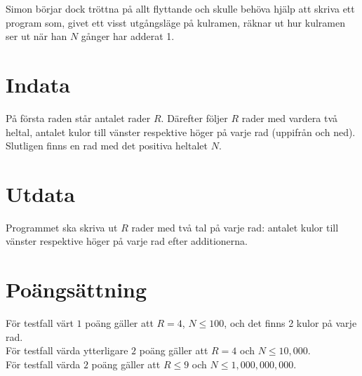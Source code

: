 Simon börjar dock tröttna på allt flyttande och skulle behöva hjälp
att skriva ett program som, givet ett visst utgångsläge på kulramen,
räknar ut hur kulramen ser ut när han $N$ gånger har adderat
1.

\section*{Indata}
På första raden står antalet rader $R$. Därefter följer $R$ rader med vardera två heltal, antalet kulor
till vänster respektive höger på varje rad (uppifrån och ned). Slutligen finns en rad med 
det positiva heltalet $N$. 

\section*{Utdata} 

Programmet ska skriva ut $R$ rader med två tal på
varje rad: antalet kulor till vänster respektive höger på varje rad
efter additionerna.

\section*{Poängsättning}

För testfall värt $1$ poäng gäller att $R=4$,  $N\le 100$, och det finns 2 kulor
på varje rad.\\
För testfall värda ytterligare $2$ poäng gäller att $R=4$ och $N\le 10,000$.\\
För testfall värda $2$ poäng gäller att $R\le 9$ och $N\le 1,000,000,000$.


